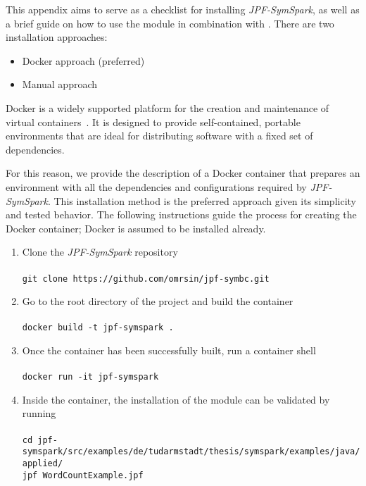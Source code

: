 \label{app:installation}

This appendix aims to serve as a checklist for installing \textit{JPF-SymSpark}, as well as a brief guide on how to use the module in combination with \jpf{}. There are two installation approaches:
\begin{itemize}
	\item Docker approach (preferred)
	\item Manual approach
\end{itemize}


Docker is a widely supported platform for the creation and maintenance of virtual containers~\cite{Merkel2014}. It is designed to provide self-contained, portable environments that are ideal for distributing software with a fixed set of dependencies.

For this reason, we provide the description of a Docker container that prepares an environment with all the dependencies and configurations required by \textit{JPF-SymSpark}. This installation method is the preferred approach given its simplicity and tested behavior. The following instructions guide the process for creating the Docker container; Docker is assumed to be installed  already.

\begin{enumerate}
	\item Clone the \textit{JPF-SymSpark} repository \\ \\	
		\lstinline[]|git clone https://github.com/omrsin/jpf-symbc.git|
	\item Go to the root directory of the project and build the container \\ \\
		\lstinline[]|docker build -t jpf-symspark .|
	\item Once the container has been successfully built, run a container shell\\ \\
		\lstinline[]|docker run -it jpf-symspark|
	\item Inside the container, the installation of the module can be validated by running \\ \\
		\lstinline[]|cd jpf-symspark/src/examples/de/tudarmstadt/thesis/symspark/examples/java/applied/| \\
		\lstinline[]|jpf WordCountExample.jpf|
\end{enumerate}

